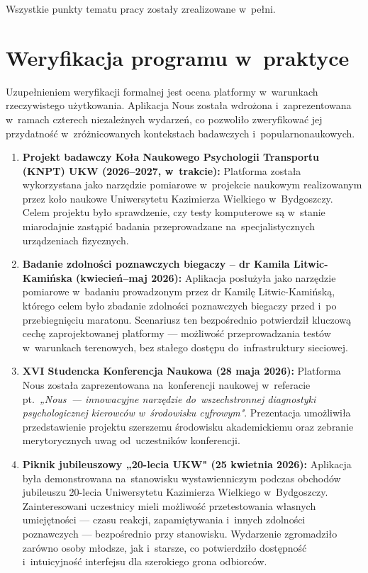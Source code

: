 \documentclass[12pt, a4paper, oneside]{report}
\begin{document}
Wszystkie punkty tematu pracy zostały zrealizowane w~pełni.


\section{Weryfikacja programu w~praktyce}
\label{sec:weryfikacja-praktyczna}

Uzupełnieniem weryfikacji formalnej jest ocena platformy w~warunkach rzeczywistego użytkowania. Aplikacja Nous została wdrożona i~zaprezentowana w~ramach czterech niezależnych wydarzeń, co pozwoliło zweryfikować jej przydatność w~zróżnicowanych kontekstach badawczych i~popularnonaukowych.

\begin{enumerate}

	\item \textbf{Projekt badawczy Koła Naukowego Psychologii Transportu (KNPT) UKW (2026--2027, w~trakcie):}
	      Platforma została wykorzystana jako narzędzie pomiarowe w~projekcie naukowym realizowanym przez koło naukowe Uniwersytetu Kazimierza Wielkiego w~Bydgoszczy. Celem projektu było sprawdzenie, czy testy komputerowe są w~stanie miarodajnie zastąpić badania przeprowadzane na~specjalistycznych urządzeniach fizycznych.

	\item \textbf{Badanie zdolności poznawczych biegaczy -- dr Kamila Litwic-Kamińska (kwiecień--maj 2026):}
	      Aplikacja posłużyła jako narzędzie pomiarowe w~badaniu prowadzonym przez dr Kamilę Litwic-Kamińską, którego celem było zbadanie zdolności poznawczych biegaczy przed i~po przebiegnięciu maratonu. Scenariusz ten bezpośrednio potwierdził kluczową cechę zaprojektowanej platformy --- możliwość przeprowadzania testów w~warunkach terenowych, bez stałego dostępu do~infrastruktury sieciowej.

	\item \textbf{XVI Studencka Konferencja Naukowa (28 maja 2026):}
	      Platforma Nous została zaprezentowana na~konferencji naukowej w~referacie pt.~\textit{„Nous~--- innowacyjne narzędzie do~wszechstronnej diagnostyki psychologicznej kierowców w~środowisku cyfrowym"}. Prezentacja umożliwiła przedstawienie projektu szerszemu środowisku akademickiemu oraz zebranie merytorycznych uwag od~uczestników konferencji.

	\item \textbf{Piknik jubileuszowy „20-lecia UKW" (25 kwietnia 2026):}
	      Aplikacja była demonstrowana na~stanowisku wystawienniczym podczas obchodów jubileuszu 20-lecia Uniwersytetu Kazimierza Wielkiego w~Bydgoszczy. Zainteresowani uczestnicy mieli możliwość przetestowania własnych umiejętności --- czasu reakcji, zapamiętywania i~innych zdolności poznawczych --- bezpośrednio przy stanowisku. Wydarzenie zgromadziło zarówno osoby młodsze, jak i~starsze, co potwierdziło dostępność i~intuicyjność interfejsu dla szerokiego grona odbiorców.

\end{enumerate}
\end{document}
